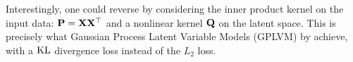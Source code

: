\begin{remark}
    Interestingly, one could reverse  by considering the inner product kernel on the input data: ${\mathbf{P}} = {\mathbf{X}} {\mathbf{X}}^\top$ and a nonlinear kernel ${\mathbf{Q}}$ on the latent space. This is precisely what Gaussian Process Latent Variable Models (GPLVM) by \cite{lawrence2005probabilistic} achieve, with a $\operatorname{KL}$ divergence loss instead of the $L_2$ loss.
\end{remark}
